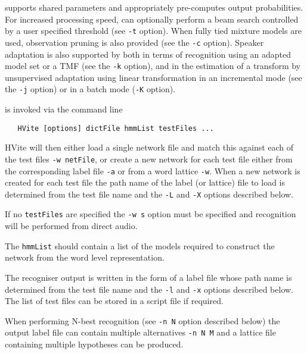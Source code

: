  supports shared parameters and appropriately pre-computes 
output probabilities. 
For increased processing speed,  can optionally perform a beam
search controlled by a user specified threshold (see \texttt{-t} option).
When fully tied mixture models are used, observation pruning is also provided
(see the  \texttt{-c} option).
Speaker adaptation is also supported by  both in terms of 
recognition using an adapted model set or a TMF (see the \texttt{-k} option),  
and in the estimation of a transform by unsupervised adaptation using 
linear transformation  in an incremental mode (see the \texttt{-j} option) or 
in a batch mode (\texttt{-K} option).


 is invoked via the command line
\begin{verbatim}
   HVite [options] dictFile hmmList testFiles ...
\end{verbatim}
HVite will then either load a single network file and match this
against each of the test files \texttt{-w netFile}, or create a
new network for each test file either from the corresponding 
label file \texttt{-a} or from a word lattice \texttt{-w}.
When a new network is created for each test file the path name
of the label (or lattice) file to load is determined from the
test file name and the \texttt{-L} and \texttt{-X} options
described below.

If no \texttt{testFiles} are specified the \texttt{-w s} option must
be specified and recognition will be performed from direct audio.

The \texttt{hmmList} should contain a list of the models required to
construct the network from the word level representation.

The recogniser output is written in the form of a label file whose
path name is determined from the test file name and the \texttt{-l} and 
\texttt{-x} options described below. The list of test files can be stored 
in a script file if required.

When performing N-best recognition (see \texttt{-n N} option described
below) the output label file can contain multiple alternatives
\texttt{-n N M} and a lattice file containing multiple hypotheses can
be produced.

